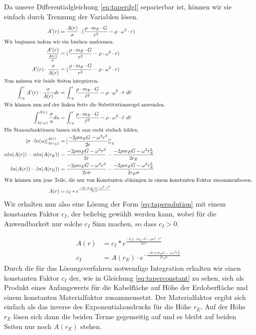 \documentclass[a4paper, 10pt]{report}
\begin{document}
Da unsere Differentialgleichung \ref{eq:taperdgl} separierbar ist, können wir sie einfach durch Trennung der Variablen lösen.
\begin{align*}
A'(r) &= \frac{A(r)}{\sigma} \cdot (\frac{\rho\cdot m_E \cdot G}{r^2} - \rho \cdot \omega^2 \cdot r)\\
\intertext{Wir beginnen indem wir ein bischen umformen.}
\frac{A'(r)}{\frac{A(r)}{\sigma}} &= (\frac{\rho\cdot m_E \cdot G}{r^2} - \rho \cdot \omega^2 \cdot r)\\
A'(r) \cdot \frac{\sigma}{A(r)} &= (\frac{\rho\cdot m_E \cdot G}{r^2} - \rho \cdot \omega^2 \cdot r)\\
\intertext{Nun müssen wir beide Seiten integrieren.}
\int_{r_E}^{r} A'(r) \cdot \frac{\sigma}{A(r)} dr &=  \int_{r_E}^{r} \frac{\rho\cdot m_E \cdot G}{\tilde{r}^2} - \rho \cdot \omega^2 \cdot \tilde{r} \ d\tilde{r}\\
\intertext{Wir können nun auf der linken Seite die Substitutionsregel anwenden.}
\int_{A(r_E)}^{A(r)} \frac{\sigma}{u} du &=  \int_{r_E}^{r} \frac{\rho\cdot m_E \cdot G}{\tilde{r}^2} - \rho \cdot \omega^2 \cdot \tilde{r} \ d\tilde{r}\\
\intertext{Die Stammfunktionen lassen sich nun recht einfach bilden.}
[\sigma \cdot ln(u)]_{A(r_E)}^{A(r)} &=  [\frac{-2\rho m_E G - \omega^2 r^3}{2 r}]_{r_E}^{r}\\
\sigma ln(A(r)) - \sigma ln(A(r_E)) &= \frac{-2\rho m_E G - \omega^2 r^3}{2 r} - \frac{-2\rho m_E G - \omega^2 r_E^3}{2 r_E}\\
ln(A(r)) - ln(A(r_E)) &= \frac{-2\rho m_E G - \omega^2 r^3}{2 r \sigma} - \frac{-2\rho m_E G - \omega^2 r_E^3}{2 r_E \sigma}\\
\intertext{Wir können nun jene Teile, die nur von Konstanten abhängen in einem konstanten Faktor zusammenfassen.}
A(r) &= c_I * e^{\frac{-2\rho \cdot m_E \cdot G - \omega^2 \cdot r^3}{2 r \sigma}}
\end{align*}
Wir erhalten nun also eine Lösung der Form \ref{eq:tapersolution} mit einem konstanten Faktor $c_I$, der beliebig gewählt werden kann, wobei für die Anwendbarkeit nur solche $c_I$ Sinn machen, so dass $c_I>0$.

\begin{align}
A(r) &= c_I * e^{\frac{-2\varrho \cdot m_E \cdot G - \rho \omega^2 \cdot r^3}{2 r \sigma}}\label{eq:tapersolution}\\
c_I &= A(r_E) \cdot e^{-\frac{-2 c \varrho m_E G - \varrho \omega^2 r_E^3}{2 r_E \sigma}}
\label{eq:taperconstant}
\end{align}
Durch die für das Lösungsverfahren notwendige Integration erhalten wir einen konstanten Faktor $c_I$ der, wie in Gleichung \ref{eq:taperconstant} zu sehen, sich als Produkt eines Anfangswerts für die Kabelfläche auf Höhe der Erdoberfläche und einem konstanten Materialfaktor zusammensetzt. Der Materialfaktor ergibt sich einfach als das inverse des Exponentialausdrucks für die Höhe $r_E$. Auf der Höhe $r_E$ lösen sich dann die beiden Terme gegenseitig auf und es bleibt auf beiden Seiten nur noch $A(r_E)$ stehen.
\end{document}

